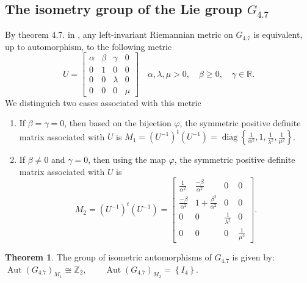 \documentclass[12pt,a4paper,twoside]{article}
\theoremstyle{definition}
\newtheorem{theorem}{Theorem}[section]
\begin{document}
\subsection{The isometry group of the Lie group $G_{4.7}$}
By theorem 4.7. in \cite{aitbenhaddou2025classification}, any left-invariant Riemannian metric on $G_{4.7}$ is equivalent, up to automorphism, to the following metric
$$U = \begin{bmatrix}
\alpha & \beta & \gamma & 0\\
0 & 1 & 0 & 0\\
0 & 0 & \lambda & 0\\
0 & 0 & 0 & \mu
\end{bmatrix} \quad \alpha, \lambda, \mu > 0, \quad \beta \geq 0, \quad \gamma \in \mathbb{R}.$$
We distinguich two cases associated with this metric
\begin{enumerate}
\item If $\beta = \gamma = 0$, then based on the bijection $\varphi$, the symmetric positive definite matrix associated with $U$ is $M_1 = (U^{-1})^t(U^{-1}) = \operatorname{diag}\left\lbrace \frac{1}{\alpha^2}, 1, \frac{1}{\lambda^2}, \frac{1}{\mu^2}\right\rbrace$.
\item If $\beta \neq 0$ and $\gamma = 0$, then using the map $\varphi$, the symmetric positive definite matrix associated with $U$ is 
$$M_2 = (U^{-1})^t(U^{-1}) = \begin{bmatrix}
\frac{1}{\alpha^2} & \frac{-\beta}{\alpha^2} & 0 & 0\\
\frac{-\beta}{\alpha^2} & 1 + \frac{\beta^2}{\alpha^2} & 0 & 0\\
0 & 0 & \frac{1}{\lambda^2} & 0\\
0 & 0 & 0 & \frac{1}{\mu^2}
\end{bmatrix}.$$
\end{enumerate}
\begin{theorem}
The group of isometric automorphisms of $G_{4.7}$ is given by:\\
$\operatorname{Aut}\left(G_{4.7}\right)_{M_1}  \cong \mathbb{Z}_2, \qquad \operatorname{Aut}\left(G_{4.7}\right)_{M_2} = \left\lbrace I_4\right\rbrace$.
\end{theorem}
\end{document}
